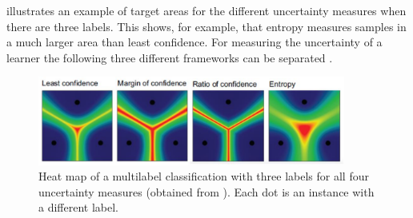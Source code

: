  illustrates an example of target areas for the different uncertainty measures when there are three labels.
This shows, for example, that entropy measures samples in a much larger area than least confidence.
For measuring the uncertainty of a learner the following three different frameworks can be separated \cite{nguyen2021howtomeasure}.
\begin{figure}[H]
  \centering
    \includegraphics[width=0.9\textwidth]{figures/heat_map.pdf}
  \caption{Heat map of a multilabel classification with three labels for all four uncertainty measures (obtained from \cite{human-in-the-loop}).
  Each dot is an instance with a different label.}
  \label{fig:uncertainty_sampling_heatmap}
\end{figure}
\clearpage





